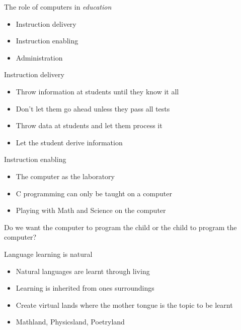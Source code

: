 \documentclass{beamer}
\begin{document}
\begin{frame}{The role of computers in \textit{education}}
   \begin{itemize}
   \item Instruction delivery
   \item Instruction enabling
   \item Administration
   \end{itemize}
\end{frame}

\begin{frame}{Instruction delivery}
   \begin{itemize}
   \item<1-> Throw information at students until they know it all
   \item<2-> Don't let them go ahead unless they pass all tests
   \item<3-> Throw data at students and let them process it
   \item<4-> Let the student derive information
   \end{itemize}
\end{frame}

\begin{frame}{Instruction enabling}
   \begin{itemize}
   \item The computer as the laboratory
   \item C programming can only be taught on a computer
   \item Playing with Math and Science on the computer
   \end{itemize}
\end{frame}

\begin{frame}
   \begin{block}{}
   \begin{center}
   Do we want the computer to program the child or the child to program the computer?
   \end{center}
   \end{block}
\end{frame}

\begin{frame}{Language learning is natural}
   \begin{itemize}
   \item<1-> Natural languages are learnt through living
   \item<2-> Learning is inherited from ones surroundings
   \item<3-> Create virtual lands where the mother tongue is the topic to be learnt
   \item<4-> Mathland, Physicsland, Poetryland
   \end{itemize}
\end{frame}
\end{document}
